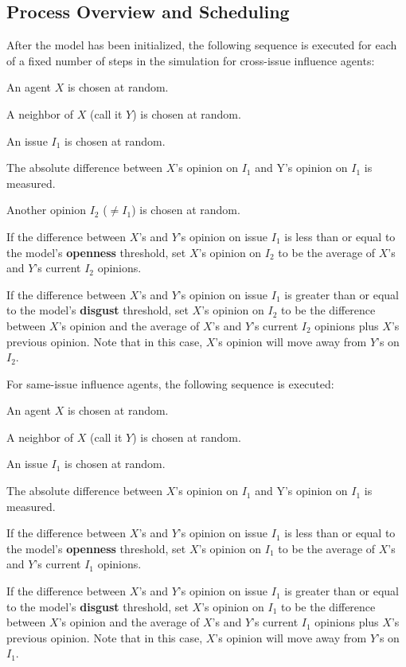 \subsection{Process Overview and Scheduling}
\label{modelProcess}

After the model has been initialized, the following sequence is executed for
each of a fixed number of steps in the simulation for cross-issue influence agents:

\begin{compactenum}
\item An agent $X$ is chosen at random.  
\item A neighbor of $X$ (call it $Y$) is chosen at random.
\item An issue $I_1$ is chosen at random.
\item The absolute difference between $X$'s opinion on $I_1$ and Y's opinion on
$I_1$ is measured.
\item Another opinion $I_2$ ($\neq I_1$) is chosen at random.
\item If the difference between $X$'s and $Y$'s opinion on issue $I_1$ is less
than or equal to the model's \textbf{openness} threshold, set $X$'s opinion on
$I_2$ to be the average of $X$'s and $Y$'s current $I_2$ opinions.
\item If the difference between $X$'s and $Y$'s opinion on issue $I_1$ is greater
than or equal to the model's \textbf{disgust} threshold, set $X$'s opinion on
$I_2$ to be the difference between $X$'s opinion and the average of $X$'s and $Y$'s current $I_2$ opinions plus $X$'s previous opinion. Note that in this case, $X$'s opinion will move away from $Y$'s on $I_2$. \\ 
\end{compactenum} 

For same-issue influence agents, the following sequence is executed:
\begin{compactenum}
\item An agent $X$ is chosen at random.  
\item A neighbor of $X$ (call it $Y$) is chosen at random.
\item An issue $I_1$ is chosen at random.
\item The absolute difference between $X$'s opinion on $I_1$ and Y's opinion on
$I_1$ is measured.
\item If the difference between $X$'s and $Y$'s opinion on issue $I_1$ is less
than or equal to the model's \textbf{openness} threshold, set $X$'s opinion on
$I_1$ to be the average of $X$'s and $Y$'s current $I_1$ opinions.
\item If the difference between $X$'s and $Y$'s opinion on issue $I_1$ is greater
than or equal to the model's \textbf{disgust} threshold, set $X$'s opinion on
$I_1$ to be the difference between $X$'s opinion and the average of $X$'s and $Y$'s current $I_1$ opinions plus $X$'s previous opinion. Note that in this case, $X$'s opinion will move away from $Y$'s on $I_1$. 
\end{compactenum}

